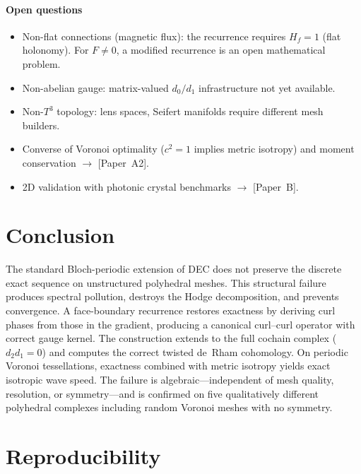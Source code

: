 \documentclass[12pt]{article}
\theoremstyle{definition}
\theoremstyle{remark}
\begin{document}
\paragraph{Open questions}
\begin{itemize}
  \item Non-flat connections (magnetic flux): the recurrence requires
    $H_f = 1$ (flat holonomy). For $F \neq 0$, a modified recurrence is an
    open mathematical problem.
  \item Non-abelian gauge: matrix-valued $d_0/d_1$ infrastructure not yet
    available.
  \item Non-$T^3$ topology: lens spaces, Seifert manifolds require different
    mesh builders.
  \item Converse of Voronoi optimality ($c^2 = 1$ implies metric isotropy) and
    moment conservation $\to$ [Paper~A2].
  \item 2D validation with photonic crystal benchmarks $\to$ [Paper~B].
\end{itemize}

\section{Conclusion}
\label{sec:conclusion}

The standard Bloch-periodic extension of DEC does not preserve the discrete
exact sequence on unstructured polyhedral meshes. This structural failure
produces spectral pollution, destroys the Hodge decomposition, and prevents
convergence. A face-boundary recurrence restores exactness by deriving curl
phases from those in the gradient, producing a canonical curl--curl operator
with correct gauge kernel. The construction extends to the full cochain complex
($d_2 d_1 = 0$) and computes the correct twisted de~Rham cohomology. On
periodic Voronoi tessellations, exactness combined with metric isotropy yields
exact isotropic wave speed. The failure is algebraic---independent of mesh
quality, resolution, or symmetry---and is confirmed on five qualitatively
different polyhedral complexes including random Voronoi meshes with no symmetry.

\section*{Reproducibility}
\end{document}
